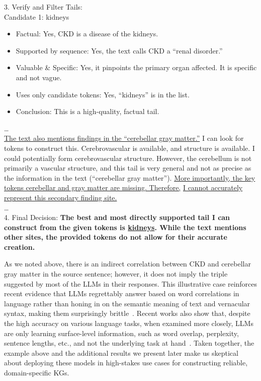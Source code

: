 \documentclass[10pt]{article}
\begin{document}
\begin{tcolorbox}[enhanced,breakable,colback=gray!5,colframe=gray!40,
                  left=6pt,right=6pt,top=6pt,bottom=6pt,boxsep=0pt]
{3. Verify and Filter Tails:\\
Candidate 1: kidneys
\begin{itemize}
    \item Factual: Yes, CKD is a disease of the kidneys.
    \item Supported by sequence: Yes, the text calls CKD a ``renal disorder.''
    \item Valuable \& Specific: Yes, it pinpoints the primary organ affected. It is specific and not vague.
    \item Uses only candidate tokens: Yes, ``kidneys'' is in the list.
    \item Conclusion: This is a high-quality, factual tail.
\end{itemize}
\ldots\\
\underline{The text also mentions findings in the ``cerebellar gray matter.''} I can look for tokens to construct this. Cerebrovascular is available, and structure is available. I could potentially form cerebrovascular structure. However, the cerebellum is not primarily a vascular structure, and this tail is very general and not as precise as the information in the text (``cerebellar gray matter''). \underline{More importantly, the key tokens cerebellar and gray matter are missing. Therefore,} \underline{I cannot accurately represent this secondary finding site.}\\
\ldots\\
4. Final Decision: \textbf{The best and most directly supported tail I can construct from the given tokens is \underline{kidneys}. While the text mentions other sites, the provided tokens do not allow for their accurate creation.}
}
\end{tcolorbox}

As we noted above, there is an indirect correlation between CKD and cerebellar gray matter in the source sentence; however, it does not imply the triple suggested by most of the LLMs in their responses. This illustrative case reinforces recent evidence that LLMs regrettably answer based on word correlations in language rather than honing in on the semantic meaning of text and vernacular syntax, making them surprisingly brittle~\cite{bert_attack}. Recent works also show that, despite the high accuracy on various language tasks, when examined more closely, LLMs are only learning surface-level information, such as word overlap, perplexity, sentence lengths, etc., and not the underlying task at hand~\cite{spurious_corr_lms}. Taken together, the example above and the additional results we present later make us skeptical about deploying these models in high-stakes use cases for constructing reliable, domain-specific KGs.
\end{document}
